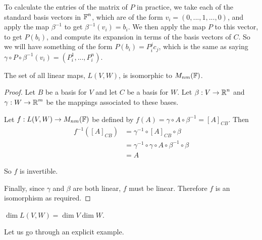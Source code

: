 To calculate the entries of the matrix of $P$ in practice, we take each of the standard basis vectors in $\operatorname{\mathbb{F}}^n$, which are of the form $v_i = (0,...,1,...,0)$, and apply the map $\beta^{-1}$ to get $\beta^{-1}(v_i) = b_i$. We then apply the map $P$ to this vector, to get $P(b_i)$, and compute its expansion in terms of the basis vectors of $C$. So we will have something of the form $P(b_i) = P_{i}^j c_j$, which is the same as saying $\gamma\circ P \circ \beta^{-1}(v_i) = (P_i^1,...,P_i^n)$. 

\begin{lemma}
    The set of all linear maps, $L(V,W)$, is isomorphic to $M_{nm}(\operatorname{\mathbb{F}})$.
\end{lemma}
\begin{proof}
Let $B$ be a basis for $V$ and let $C$ be a basis for $W$. Let $\beta : V \to \operatorname{\mathbb{R}}^n$ and $\gamma :W \to \operatorname{\mathbb{R}}^m$ be the mappings associated to these bases.

Let $f : L(V,W)\to M_{nm}(\operatorname{\mathbb{F}})$ be defined by $f(A) = \gamma\circ A \circ \beta^{-1} = [A]_{CB}$. Then 
\begin{align*}f^{-1}([A]_{CB}) &= \gamma^{-1}\circ[A]_{CB}\circ\beta \\&= \gamma^{-1}\circ\gamma\circ A\circ\beta^{-1}\circ\beta \\&= A\end{align*} 

So $f$ is invertible.

Finally, since $\gamma$ and $\beta$ are both linear, $f$ must be linear. Therefore $f$ is an isomorphism as required.
\end{proof}
\begin{cor}
    $\dim L(V,W) =\dim V \dim W$.
\end{cor}

Let us go through an explicit example.

